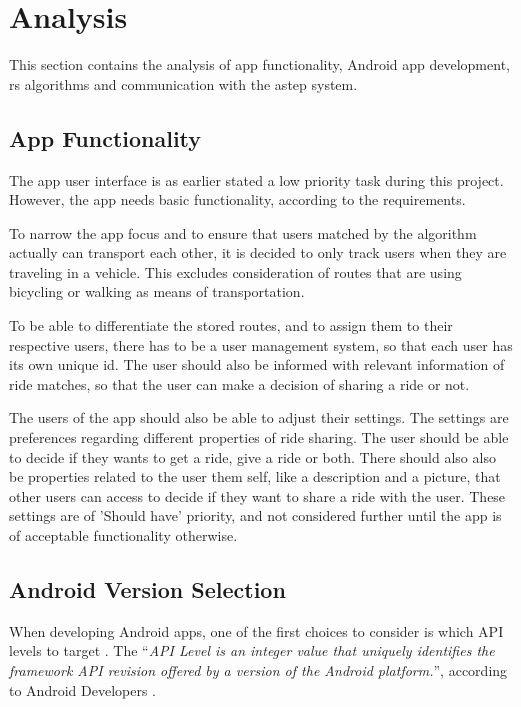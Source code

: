 \section{Analysis}
This section contains the analysis of app functionality, Android app development, \gls{rs} algorithms and communication with the \gls{astep} system.

\subsection{App Functionality}
The app user interface is as earlier stated a low priority task during this project.
However, the app needs basic functionality, according to the requirements.

To narrow the app focus and to ensure that users matched by the algorithm actually can transport each other, it is decided to only track users when they are traveling in a vehicle.
This excludes consideration of routes that are using bicycling or walking as means of transportation.

To be able to differentiate the stored routes, and to assign them to their respective users, there has to be a user management system, so that each user has its own unique id.
The user should also be informed with relevant information of ride matches, so that the user can make a decision of sharing a ride or not.

The users of the app should also be able to adjust their settings.
The settings are preferences regarding different properties of ride sharing.
The user should be able to decide if they wants to get a ride, give a ride or both.
There should also also be properties related to the user them self, like a description and a picture, that other users can access to decide if they want to share a ride with the user.
These settings are of 'Should have' priority, and not considered further until the app is of acceptable functionality otherwise.

\subsection{Android Version Selection}
When developing Android apps, one of the first choices to consider is which API levels to target \cite{usesSDK}.
The ``\textit{API Level is an integer value that uniquely identifies the framework API revision offered by a version of the Android platform.}'', according to Android Developers \cite{usesSDK}.


